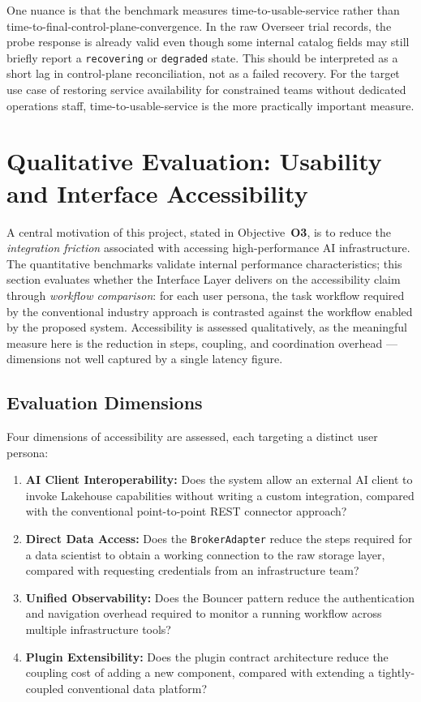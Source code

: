 \documentclass[12pt, a4paper]{report}
\begin{document}
One nuance is that the benchmark measures time-to-usable-service rather than
time-to-final-control-plane-convergence. In the raw Overseer trial records, the probe
response is already valid even though some internal catalog fields may still briefly
report a \texttt{recovering} or \texttt{degraded} state. This should be interpreted as
a short lag in control-plane reconciliation, not as a failed recovery. For the target
use case of restoring service availability for constrained teams without dedicated
operations staff, time-to-usable-service is the more practically important measure.

\section{Qualitative Evaluation: Usability and Interface Accessibility}
\label{sec:exp_usability}

A central motivation of this project, stated in Objective~\textbf{O3}, is to reduce
the \emph{integration friction} associated with accessing high-performance AI
infrastructure.
The quantitative benchmarks validate internal performance characteristics; this section
evaluates whether the Interface Layer delivers on the accessibility claim through
\emph{workflow comparison}: for each user persona, the task workflow required by the
conventional industry approach is contrasted against the workflow enabled by the
proposed system.
Accessibility is assessed qualitatively, as the meaningful measure here is the
reduction in steps, coupling, and coordination overhead — dimensions not well captured
by a single latency figure.

\subsection{Evaluation Dimensions}
\label{ssec:usability_dimensions}

Four dimensions of accessibility are assessed, each targeting a distinct user persona:

\begin{enumerate}
  \item \textbf{AI Client Interoperability:} Does the system allow an external AI
  client to invoke Lakehouse capabilities without writing a custom integration,
  compared with the conventional point-to-point REST connector approach?
  \item \textbf{Direct Data Access:} Does the \texttt{BrokerAdapter} reduce the steps
  required for a data scientist to obtain a working connection to the raw storage
  layer, compared with requesting credentials from an infrastructure team?
  \item \textbf{Unified Observability:} Does the Bouncer pattern reduce the
  authentication and navigation overhead required to monitor a running workflow across
  multiple infrastructure tools?
  \item \textbf{Plugin Extensibility:} Does the plugin contract architecture reduce
  the coupling cost of adding a new component, compared with extending a
  tightly-coupled conventional data platform?
\end{enumerate}
\end{document}
